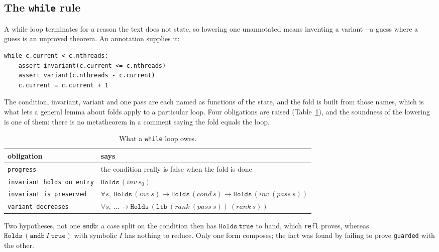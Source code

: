 \documentclass[11pt]{article}
\newcommand{\code}[1]{\texttt{#1}}
\begin{document}
\subsection{The \code{while} rule}
\label{sec:whilerule}

A while loop terminates for a reason the text does not state, so lowering one
unannotated means inventing a variant---a guess where a guess is an unproved
theorem. An annotation supplies it:

\begin{lstlisting}
while c.current < c.nthreads:
    assert invariant(c.current <= c.nthreads)
    assert variant(c.nthreads - c.current)
    c.current = c.current + 1
\end{lstlisting}

The condition, invariant, variant and one pass are each named as functions of
the state, and the fold is built from those names, which is what lets a
general lemma about folds apply to a particular loop. Four obligations are
raised (Table~\ref{tab:while}), and the soundness of the lowering is one of
them: there is no metatheorem in a comment saying the fold equals the loop.

\begin{table}[h]
\centering
\small
\begin{tabular}{ll}
\toprule
obligation & says \\
\midrule
\code{progress} & the condition really is false when the fold is done \\
\code{invariant holds on entry} & $\code{Holds}\,(\mathit{inv}\ s_0)$ \\
\code{invariant is preserved} & $\forall s,\ \code{Holds}\,(\mathit{inv}\ s) \to \code{Holds}\,(\mathit{cond}\ s) \to \code{Holds}\,(\mathit{inv}\ (\mathit{pass}\ s))$ \\
\code{variant decreases} & $\forall s,\ \ldots \to \code{Holds}\,(\code{ltb}\ (\mathit{rank}\ (\mathit{pass}\ s))\ (\mathit{rank}\ s))$ \\
\bottomrule
\end{tabular}
\caption{What a \code{while} loop owes.}
\label{tab:while}
\end{table}

Two hypotheses, not one \code{andb}: a case split on the condition then has
$\code{Holds}\ \code{true}$ to hand, which \code{refl} proves, whereas
$\code{Holds}\,(\code{andb}\ I\ \code{true})$ with symbolic $I$ has nothing to
reduce. Only one form composes; the fact was found by failing to prove
\code{guarded} with the other.
\end{document}
